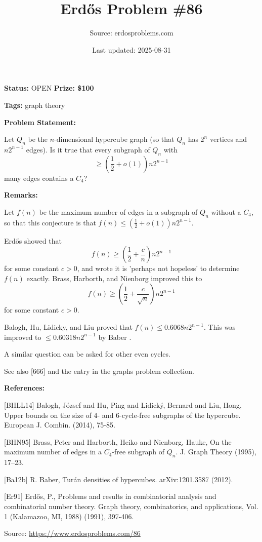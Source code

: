 \documentclass{article}
\title{Erd\H{o}s Problem \#86}
\date{Last updated: 2025-08-31}
\author{Source: erdosproblems.com}
\begin{document}
\maketitle

\noindent\textbf{Status:} OPEN \quad \textbf{Prize: \$100}

\noindent\textbf{Tags:} graph theory

\medskip
\noindent\textbf{Problem Statement:}

Let $Q_n$ be the $n$-dimensional hypercube graph (so that $Q_n$ has $2^n$ vertices and $n2^{n-1}$ edges). Is it true that every subgraph of $Q_n$ with\[\geq \left(\frac{1}{2}+o(1)\right)n2^{n-1}\]many edges contains a $C_4$?

\bigskip
\noindent\textbf{Remarks:}

Let $f(n)$ be the maximum number of edges in a subgraph of $Q_n$ without a $C_4$, so that this conjecture is that $f(n)\leq (\frac{1}{2}+o(1))n2^{n-1}$.

Erd\H{o}s \cite{Er91} showed that\[f(n) \geq \left(\frac{1}{2}+\frac{c}{n}\right)n2^{n-1}\]for some constant $c>0$, and wrote it is 'perhaps not hopeless' to determine $f(n)$ exactly. Brass, Harborth, and Nienborg \cite{BHN95} improved this to\[f(n) \geq \left(\frac{1}{2}+\frac{c}{\sqrt{n}}\right)n2^{n-1}\]for some constant $c>0$.

Balogh, Hu, Lidicky, and Liu \cite{BHLL14} proved that $f(n)\leq 0.6068 n2^{n-1}$. This was improved to $\leq 0.60318 n2^{n-1}$ by Baber \cite{Ba12b}.

A similar question can be asked for other even cycles.

See also [666] and the entry in the graphs problem collection.

\bigskip
\noindent\textbf{References:}

[BHLL14] Balogh, J\'{o}zsef and Hu, Ping and Lidick\'{y}, Bernard and Liu, Hong, Upper bounds on the size of 4- and 6-cycle-free subgraphs of the hypercube. European J. Combin. (2014), 75-85.
 
 [BHN95] Brass, Peter and Harborth, Heiko and Nienborg, Hauke, On the maximum number of edges in a {$C_4$}-free subgraph of
{$Q_n$}. J. Graph Theory (1995), 17--23.
 
 [Ba12b] R. Baber, Tur\'{a}n densities of hypercubes. arXiv:1201.3587 (2012).
 
 [Er91] Erd\H{o}s, P., Problems and results in combinatorial analysis and combinatorial number theory. Graph theory, combinatorics, and applications, Vol. 1 (Kalamazoo, MI, 1988) (1991), 397-406.

\bigskip
\noindent\small{Source: \url{https://www.erdosproblems.com/86}}
\end{document}
